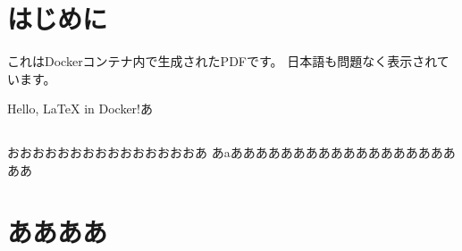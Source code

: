 \documentclass[a4paper]{jlreq}
\begin{document}
\section{はじめに}
これはDockerコンテナ内で生成されたPDFです。
日本語も問題なく表示されています。

Hello, LaTeX in Docker!あ\subsection{}
おおおおおおおおおおおおおおおあ
あaああああああああああああああああああああ
\section{ああああ}
\end{document}
